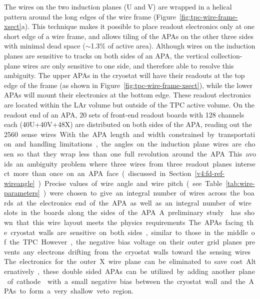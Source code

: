 The wires on the two induction planes (U and V) are wrapped in a
helical pattern around the long edges of the wire frame
(Figure~\ref{fig:tpc-wire-frame-xsect}a). This technique makes it
possible to place readout electronics only at one short edge of a wire 
frame, and allows tiling of the APAs on the other three sides with
minimal dead space ($\sim$1.3\% of active area).  Although wires on the %
induction planes are sensitive to tracks on both sides of an APA,
the vertical collection-plane wires are only sensitive to one side, and
therefore able to resolve this ambiguity.  The upper APAs in the
cryostat will have their readouts at the top edge of the frame (as
shown in Figure~\ref{fig:tpc-wire-frame-xsect}), while the lower APAs
will mount their electronics at the bottom edge.  These readout
electronics are located within the LAr volume but  outside of the TPC active volume.  On the
readout end of an APA, 20 sets of front-end readout boards with 128
channels each (40U+40V+48X) are distributed on both sides of the APA,
reading out the \SI{2560} sense wires.

With the APA length and width constrained by transportation and handling
limitations, the angles on the induction plane wires are chosen so
that they wrap less than one full revolution around the APA.  This
avoids an ambiguity problem where three wires from three readout
planes intersect more than once on an APA face (discussed in 
Section~\ref{v4:fd-ref-wireangle}).  Precise values of
wire angle and wire pitch (see Table~\ref{tab:wire-parameters}) were
chosen to give an integral number of wires across the boards at the
electronics end of the APA as well as an integral number of wire slots
in the boards along the sides of the APA.  A preliminary
study\cite{wire-orientation} has shown that this wire layout meets the
physics requirements.

The APAs facing the cryostat walls are sensitive on both sides, similar to
 those in the middle of the TPC.  However, the negative bias
voltage on their outer grid planes prevents any electrons drifting
from the cryostat walls toward the sensing wires.  The electronics for
the outer X wire plane can be eliminated to save cost.  Alternatively, %
these double sided APAs can be utilized by adding another plane of cathode 
with a small negative bias between the cryostat wall and the APAs to
form a very shallow veto region.


